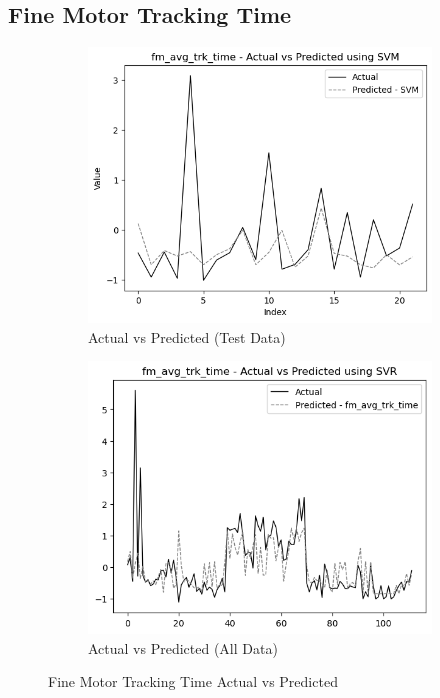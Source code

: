 \subsection*{Fine Motor Tracking Time}

\begin{figure}[htbp]
    \centering
    \begin{subfigure}[b]{0.49\textwidth}
        \centering
        \includegraphics[width=\textwidth]{images/test_data_fine_motor_tracking_time.png}
        \caption{Actual vs Predicted (Test Data)}
        \label{fig:actual_vs_predicted_fm_avg_trk_time_test}
    \end{subfigure}\hfill
    \begin{subfigure}[b]{0.49\textwidth}
        \centering
        \includegraphics[width=\textwidth]{images/all_data_fine_motor_tracking_time.png}
        \caption{Actual vs Predicted (All Data)}
        \label{fig:actual_vs_predicted_fm_avg_trk_time_all_data}
    \end{subfigure}
    \caption{Fine Motor Tracking Time Actual vs Predicted}
    \label{fig:fine_motor_tracking_time_comparison}
\end{figure}


